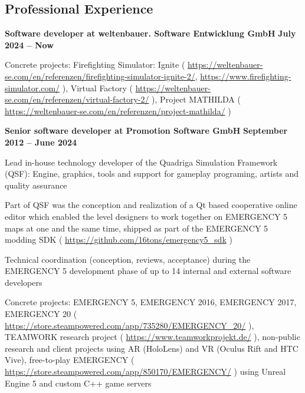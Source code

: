\documentclass[margin,line]{Ofenberg_Resume}
\begin{document}
\begin{resume}
	\section{\mysidestyle Professional Experience}
	\textbf{Software developer at weltenbauer. Software Entwicklung GmbH} \hfill \textbf{July 2024 -- Now}\vspace{-3mm}\\\vspace{-1mm}%
	\begin{list2}
		\item Concrete projects: Firefighting Simulator: Ignite ( \url{https://weltenbauer-se.com/en/referenzen/firefighting-simulator-ignite-2/}, \url{https://www.firefighting-simulator.com/} ), Virtual Factory ( \url{https://weltenbauer-se.com/en/referenzen/virtual-factory-2/} ), Project MATHILDA ( \url{https://weltenbauer-se.com/en/referenzen/project-mathilda/} )
	\end{list2}\vspace{-1.5mm}
	\textbf{Senior software developer at Promotion Software GmbH} \hfill \textbf{September 2012 -- June 2024}\vspace{-3mm}\\\vspace{-1mm}%
	\begin{list2}
		\item Lead in-house technology developer of the Quadriga Simulation Framework (QSF): Engine, graphics, tools and support for gameplay programing, artists and quality assurance
		\item Part of QSF was the conception and realization of a Qt based cooperative online editor which enabled the level designers to work together on EMERGENCY 5 maps at one and the same time, shipped as part of the EMERGENCY 5 modding SDK ( \url{https://github.com/16tons/emergency5_sdk} )
		\item Technical coordination (conception, reviews, acceptance) during the EMERGENCY 5 development phase of up to 14 internal and external software developers
		\item Concrete projects: EMERGENCY 5, EMERGENCY 2016, EMERGENCY 2017, EMERGENCY 20 ( \url{https://store.steampowered.com/app/735280/EMERGENCY_20/} ), TEAMWORK research project ( \url{https://www.teamworkprojekt.de/} ), non-public research and client projects using AR (HoloLens) and VR (Oculus Rift and HTC Vive), free-to-play EMERGENCY ( \url{https://store.steampowered.com/app/850170/EMERGENCY/} ) using Unreal Engine 5 and custom C++ game servers
	\end{list2}\vspace{-1.5mm}

\end{resume}
\end{document}
